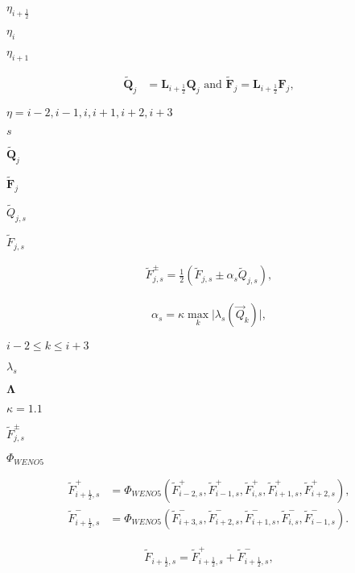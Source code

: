 \documentclass{article}
\begin{document}
$\eta_{i+\frac{1}{2}}$
\pagebreak

$\eta_i$
\pagebreak

$\eta_{i+1}$
\pagebreak

\[ \begin{align*} \tilde{\mathbf{Q}}_{j} &= \mathbf{L}_{i+\frac{1}{2}}\mathbf{Q}_{j} \text{{} and }\tilde{\mathbf{F}}_{j} = \mathbf{L}_{i+\frac{1}{2}}\mathbf{F}_{j}, \end{align*} \]
\pagebreak

$\eta = i-2, i-1, i, i+1, i+2, i+3$
\pagebreak

$s$
\pagebreak

$\tilde{\mathbf{Q}}_{j}$
\pagebreak

$\tilde{\mathbf{F}}_{j}$
\pagebreak

$\tilde{Q}_{j,s}$
\pagebreak

$\tilde{F}_{j,s}$
\pagebreak

\[ \begin{align*} \tilde{F}_{j,s}^{\pm} =\frac{1}{2}(\tilde{F}_{j,s}\pm\alpha_{s}\tilde{Q}_{j,s}), \end{align*} \]
\pagebreak

\[ \begin{align*}\label{eq:alpha} \alpha_{s} = \kappa \underset{k}\max \lvert \lambda_{s}(\vec{Q}_{k})\rvert, \end{align*} \]
\pagebreak

$i-2 \le k \le i+3$
\pagebreak

$\lambda_{s}$
\pagebreak

$\mathbf{\Lambda}$
\pagebreak

$\kappa=1.1$
\pagebreak

$\tilde{F}_{j,s}^{\pm}$
\pagebreak

$\Phi_{WENO5}$
\pagebreak

\[ \begin{align*} \tilde{F}_{i+\frac{1}{2},s}^{+} &= \Phi_{WENO5}(\tilde{F}_{i-2,s}^{+},\tilde{F}_{i-1,s}^{+},\tilde{F}_{i,s}^{+},\tilde{F}_{i+1,s}^{+},\tilde{F}_{i+2,s}^{+}), \\ \tilde{F}_{i+\frac{1}{2},s}^{-} &= \Phi_{WENO5}(\tilde{F}_{i+3,s}^{-},\tilde{F}_{i+2,s}^{-},\tilde{F}_{i+1,s}^{-},\tilde{F}_{i,s}^{-},\tilde{F}_{i-1,s}^{-}). \end{align*} \]
\pagebreak

\[ \begin{align*} \tilde{F}_{i+\frac{1}{2},s} = \tilde{F}_{i+\frac{1}{2},s}^{+} + \tilde{F}_{i+\frac{1}{2},s}^{-}, \end{align*} \]
\pagebreak
\end{document}
